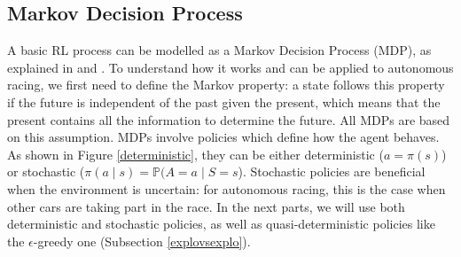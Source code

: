 \subsection{Markov Decision Process}
A basic RL process can be modelled as a Markov Decision Process (MDP), as explained in \cite{silver2015} and \cite{mdpinai}. To understand how it works and can be applied to autonomous racing, we first need to define the Markov property: a state follows this property if the future is independent of the past given the present, which means that the present contains all the information to determine the future. All MDPs are based on this assumption. MDPs involve policies which define how the agent behaves. As shown in Figure \ref{deterministic}, they can be either deterministic ($a = \pi(s)$) or stochastic ($\pi(a \mid s) = \mathbb{P}(A=a \mid S=s$). Stochastic policies are beneficial when the environment is uncertain: for autonomous racing, this is the case when other cars are taking part in the race. In the next parts, we will use both deterministic and stochastic policies, as well as quasi-deterministic policies like the $\epsilon$-greedy one (Subsection \ref{explovsexplo}).
